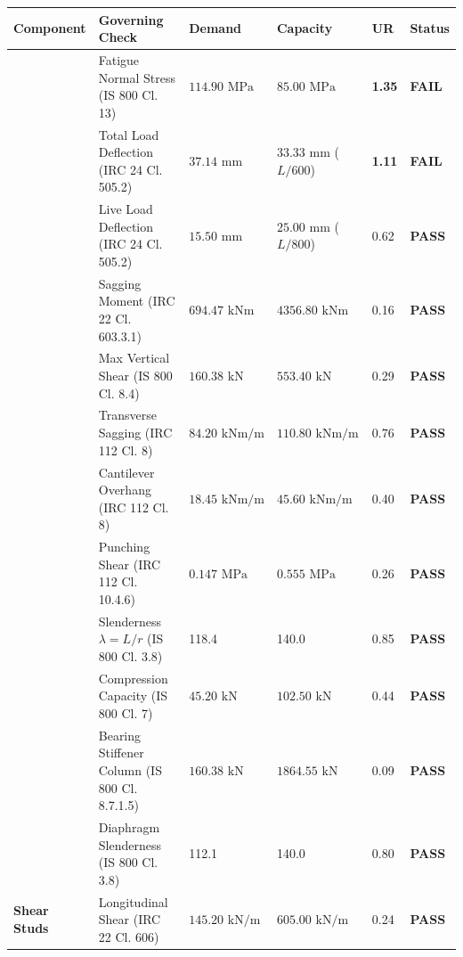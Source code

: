 \documentclass[12pt,a4paper]{report}
\numberwithin{table}{chapter}
\numberwithin{figure}{chapter}
\renewcommand{\arraystretch}{1.15}
\newcommand{\passBadge}{\colorbox{passBg}{\textcolor{passGreen}{\textbf{PASS}}}}
\newcommand{\failBadge}{\colorbox{failBg}{\textcolor{failRed}{\textbf{FAIL}}}}
\begin{document}
\begingroup
\small
\setlength{\tabcolsep}{3.5pt}
\renewcommand{\arraystretch}{1.02}
\begin{longtable}{|L{3.1cm}|L{4.2cm}|C{2.5cm}|C{2.5cm}|C{1.4cm}|C{1.5cm}|}
\hline
\textbf{Component} & \textbf{Governing Check} & \textbf{Demand} & \textbf{Capacity} & \textbf{UR} & \textbf{Status} \\
\hline
\endhead
\hline
{} 
 & Fatigue Normal Stress (IS 800 Cl. 13) & $114.90\text{ MPa}$ & $85.00\text{ MPa}$ & \textcolor{failRed}{\textbf{1.35}} & \failBadge{} \\[1.5pt]
 & Total Load Deflection (IRC 24 Cl. 505.2) & $37.14\text{ mm}$ & $33.33\text{ mm}$ ($L/600$) & \textcolor{failRed}{\textbf{1.11}} & \failBadge{} \\[1.5pt]
 & Live Load Deflection (IRC 24 Cl. 505.2) & $15.50\text{ mm}$ & $25.00\text{ mm}$ ($L/800$) & 0.62 & \passBadge{} \\[1.5pt]
 & Sagging Moment (IRC 22 Cl. 603.3.1) & $694.47\text{ kNm}$ & $4356.80\text{ kNm}$ & 0.16 & \passBadge{} \\[1.5pt]
 & Max Vertical Shear (IS 800 Cl. 8.4) & $160.38\text{ kN}$ & $553.40\text{ kN}$ & 0.29 & \passBadge{} \\[1.5pt]
\hline
{} 
 & Transverse Sagging (IRC 112 Cl. 8) & $84.20\text{ kNm/m}$ & $110.80\text{ kNm/m}$ & 0.76 & \passBadge{} \\[1.5pt]
 & Cantilever Overhang (IRC 112 Cl. 8) & $18.45\text{ kNm/m}$ & $45.60\text{ kNm/m}$ & 0.40 & \passBadge{} \\[1.5pt]
 & Punching Shear (IRC 112 Cl. 10.4.6) & $0.147\text{ MPa}$ & $0.555\text{ MPa}$ & 0.26 & \passBadge{} \\[1.5pt]
\hline
{} 
 & Slenderness $\lambda = L/r$ (IS 800 Cl. 3.8) & 118.4 & 140.0 & 0.85 & \passBadge{} \\[1.5pt]
 & Compression Capacity (IS 800 Cl. 7) & $45.20\text{ kN}$ & $102.50\text{ kN}$ & 0.44 & \passBadge{} \\[1.5pt]
\hline
{} 
 & Bearing Stiffener Column (IS 800 Cl. 8.7.1.5) & $160.38\text{ kN}$ & $1864.55\text{ kN}$ & 0.09 & \passBadge{} \\[1.5pt]
 & Diaphragm Slenderness (IS 800 Cl. 3.8) & 112.1 & 140.0 & 0.80 & \passBadge{} \\[1.5pt]
\hline
\textbf{Shear Studs} & Longitudinal Shear (IRC 22 Cl. 606) & $145.20\text{ kN/m}$ & $605.00\text{ kN/m}$ & 0.24 & \passBadge{} \\[1.5pt]
\hline
\end{longtable}
\endgroup
\end{document}
